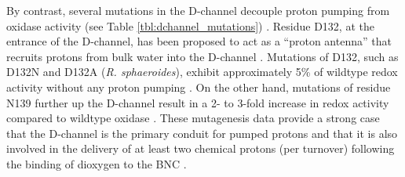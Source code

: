 By contrast, several mutations in the D-channel decouple proton pumping from oxidase activity (see Table \ref{tbl:dchannel_mutations}) \cite{Pfitzner:2000p5484,Gennis:2004p10239}. Residue D132, at the entrance of the D-channel, has been proposed to act as a ``proton antenna'' that recruits protons from bulk water into the D-channel \cite{Mills:2000p4585,Henry:2009p4543}. Mutations of D132, such as D132N and D132A (\emph{R. sphaeroides}), exhibit approximately 5\% of wildtype redox activity without any proton pumping \cite{Fetter:1996p5464}. On the other hand, mutations of residue N139 further up the D-channel result in a 2- to 3-fold increase in redox activity compared to wildtype oxidase \cite{Pfitzner:2000p5484,Pawate:2002p5614,Namslauer:2003p6853}. These mutagenesis data provide a strong case that the D-channel is the primary conduit for pumped protons and that it is also involved in the delivery of at least two chemical protons (per turnover) following the binding of dioxygen to the BNC \cite{Brzezinski:1998p5542,Gennis:1998p5649,Ganesan:2010p8417}.


